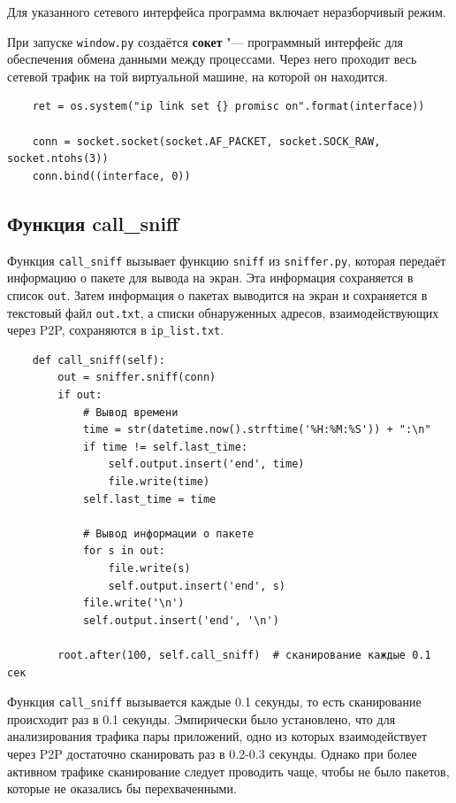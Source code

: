 \documentclass[bachelor, och, coursework]{SCWorks}
\begin{document}
Для указанного сетевого интерфейса программа включает неразборчивый режим.

При запуске \texttt{window.py} создаётся \textbf{сокет} "--- программный интерфейс для обеспечения обмена данными между процессами. Через него проходит весь сетевой трафик на той виртуальной машине, на которой он находится. 

\begin{verbatim}
    ret = os.system("ip link set {} promisc on".format(interface))

    conn = socket.socket(socket.AF_PACKET, socket.SOCK_RAW, socket.ntohs(3))
    conn.bind((interface, 0))
\end{verbatim}

\subsection{Функция call_sniff}
Функция \texttt{call_sniff} вызывает функцию \texttt{sniff} из \texttt{sniffer.py}, которая передаёт информацию о пакете для вывода на экран. Эта информация сохраняется в список \texttt{out}. Затем информация о пакетах выводится на экран и сохраняется в текстовый файл \texttt{out.txt}, а списки обнаруженных адресов, взаимодействующих через P2P, сохраняются в \texttt{ip_list.txt}.

\begin{verbatim}
    def call_sniff(self):
        out = sniffer.sniff(conn)
        if out:
            # Вывод времени
            time = str(datetime.now().strftime('%H:%M:%S')) + ":\n"
            if time != self.last_time:
                self.output.insert('end', time)
                file.write(time)
            self.last_time = time

            # Вывод информации о пакете
            for s in out:
                file.write(s)
                self.output.insert('end', s)
            file.write('\n')
            self.output.insert('end', '\n')

        root.after(100, self.call_sniff)  # сканирование каждые 0.1 сек
\end{verbatim}

Функция \texttt{call_sniff} вызывается каждые 0.1 секунды, то есть сканирование происходит раз в 0.1 секунды.
Эмпирически было установлено, что для анализирования трафика пары приложений, одно из которых взаимодействует через P2P достаточно сканировать раз в 0.2-0.3 секунды. Однако при более активном трафике сканирование следует проводить чаще, чтобы не было пакетов, которые не оказались бы перехваченными.
\end{document}
